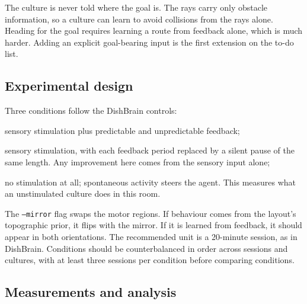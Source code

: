 \documentclass[11pt,a4paper]{article}
\newcommand{\code}[1]{\texttt{#1}}
\begin{document}
The culture is never told where the goal is. The rays carry only obstacle information, so a
culture can learn to avoid collisions from the rays alone. Heading for the goal requires
learning a route from feedback alone, which is much harder. Adding an explicit goal-bearing input
is the first extension on the to-do list.

\subsection{Experimental design}\label{sec:design}

Three conditions follow the DishBrain controls:
\begin{description}[nosep, font=\normalfont\ttfamily]
  \item[feedback] sensory stimulation plus predictable and unpredictable feedback;
  \item[silent] sensory stimulation, with each feedback period replaced by a silent pause of the
        same length. Any improvement here comes from the sensory input alone;
  \item[rest] no stimulation at all; spontaneous activity steers the agent. This measures what
        an unstimulated culture does in this room.
\end{description}
The \code{--mirror} flag swaps the motor regions. If behaviour comes from the layout's
topographic prior, it flips with the mirror. If it is learned from feedback, it should appear in
both orientations. The recommended unit is a 20-minute session, as in DishBrain. Conditions
should be counterbalanced in order across sessions and cultures, with at least three sessions
per condition before comparing conditions.

\subsection{Measurements and analysis}\label{sec:analysis}
\end{document}
